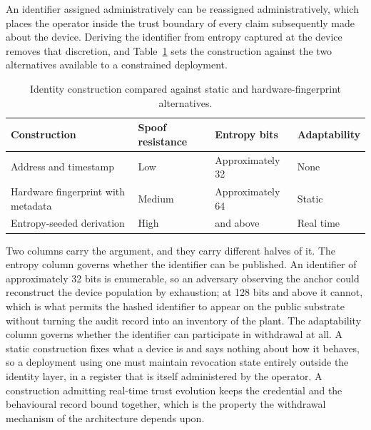 An identifier assigned administratively can be reassigned administratively, which places the operator inside the trust boundary of every claim subsequently made about the device. Deriving the identifier from entropy captured at the device removes that discretion, and Table~\ref{tab:id-comparison} sets the construction against the two alternatives available to a constrained deployment.

\begin{table}[!htbp]
  \centering
  \footnotesize
  \setlength{\tabcolsep}{5pt}
  \renewcommand{\arraystretch}{1.3}
  \caption{Identity construction compared against static and hardware-fingerprint alternatives.}
  \label{tab:id-comparison}
  \begin{tabularx}{\textwidth}{@{}
      >{\raggedright\arraybackslash}p{4.4cm}
      >{\raggedright\arraybackslash}p{2.6cm}
      >{\raggedright\arraybackslash}p{2.2cm}
      >{\raggedright\arraybackslash}X@{}}
    \toprule
    \textbf{Construction} & \textbf{Spoof resistance} & \textbf{Entropy bits} & \textbf{Adaptability} \\
    \midrule
    Address and timestamp & Low & Approximately 32 & None \\
    Hardware fingerprint with metadata & Medium & Approximately 64 & Static \\
    Entropy-seeded derivation & High & 128 and above & Real time \\
    \bottomrule
  \end{tabularx}
\end{table}

Two columns carry the argument, and they carry different halves of it. The entropy column governs whether the identifier can be published. An identifier of approximately 32 bits is enumerable, so an adversary observing the anchor could reconstruct the device population by exhaustion; at 128 bits and above it cannot, which is what permits the hashed identifier to appear on the public substrate without turning the audit record into an inventory of the plant. The adaptability column governs whether the identifier can participate in withdrawal at all. A static construction fixes what a device is and says nothing about how it behaves, so a deployment using one must maintain revocation state entirely outside the identity layer, in a register that is itself administered by the operator. A construction admitting real-time trust evolution keeps the credential and the behavioural record bound together, which is the property the withdrawal mechanism of the architecture depends upon.

